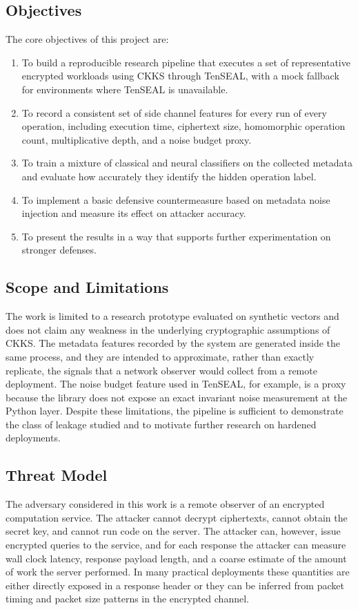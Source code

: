 \documentclass[12pt,a4paper]{article}
\begin{document}
\subsection{Objectives}
The core objectives of this project are:
\begin{enumerate}[leftmargin=*]
  \item To build a reproducible research pipeline that executes a set of representative encrypted workloads using CKKS through TenSEAL, with a mock fallback for environments where TenSEAL is unavailable.
  \item To record a consistent set of side channel features for every run of every operation, including execution time, ciphertext size, homomorphic operation count, multiplicative depth, and a noise budget proxy.
  \item To train a mixture of classical and neural classifiers on the collected metadata and evaluate how accurately they identify the hidden operation label.
  \item To implement a basic defensive countermeasure based on metadata noise injection and measure its effect on attacker accuracy.
  \item To present the results in a way that supports further experimentation on stronger defenses.
\end{enumerate}

\subsection{Scope and Limitations}
The work is limited to a research prototype evaluated on synthetic vectors and does not claim any weakness in the underlying cryptographic assumptions of CKKS. The metadata features recorded by the system are generated inside the same process, and they are intended to approximate, rather than exactly replicate, the signals that a network observer would collect from a remote deployment. The noise budget feature used in TenSEAL, for example, is a proxy because the library does not expose an exact invariant noise measurement at the Python layer. Despite these limitations, the pipeline is sufficient to demonstrate the class of leakage studied and to motivate further research on hardened deployments.

\subsection{Threat Model}
The adversary considered in this work is a remote observer of an encrypted computation service. The attacker cannot decrypt ciphertexts, cannot obtain the secret key, and cannot run code on the server. The attacker can, however, issue encrypted queries to the service, and for each response the attacker can measure wall clock latency, response payload length, and a coarse estimate of the amount of work the server performed. In many practical deployments these quantities are either directly exposed in a response header or they can be inferred from packet timing and packet size patterns in the encrypted channel.
\end{document}
